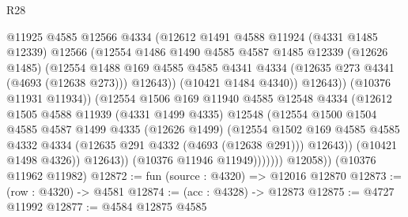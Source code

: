 \begin{lexlean}{R28}
\begin{coremodule}
                            @11925
                            @4585
                            @12566
                            @4334
                            (@12612
                              @1491
                              @4588
                              @11924
                              (@4331 @1485 @12339)
                              @12566
                              (@12554
                                @1486
                                @1490
                                @4585
                                @4587
                                @1485
                                @12339
                                (@12626 @1485)
                                (@12554
                                  @1488
                                  @169
                                  @4585
                                  @4585
                                  @4341
                                  @4334
                                  (@12635 @273 @4341 (@4693 (@12638 @273)))
                                  @12643))
                              (@10421 @1484 @4340))
                            @12643))
                        (@10376 @11931 @11934))
                      (@12554
                        @1506
                        @169
                        @11940
                        @4585
                        @12548
                        @4334
                        (@12612
                          @1505
                          @4588
                          @11939
                          (@4331 @1499 @4335)
                          @12548
                          (@12554
                            @1500
                            @1504
                            @4585
                            @4587
                            @1499
                            @4335
                            (@12626 @1499)
                            (@12554
                              @1502
                              @169
                              @4585
                              @4585
                              @4332
                              @4334
                              (@12635 @291 @4332 (@4693 (@12638 @291)))
                              @12643))
                          (@10421 @1498 @4326))
                        @12643))
                    (@10376 @11946 @11949)))))))
        @12058))
    (@10376 @11962 @11982)
@12872 := fun (source : @4320) => @12016 @12870
@12873 := (row : @4320) -> @4581
@12874 := (acc : @4328) -> @12873
@12875 := @4727 @11992
@12877 := @4584 @12875 @4585

\end{coremodule}
\end{lexlean}
